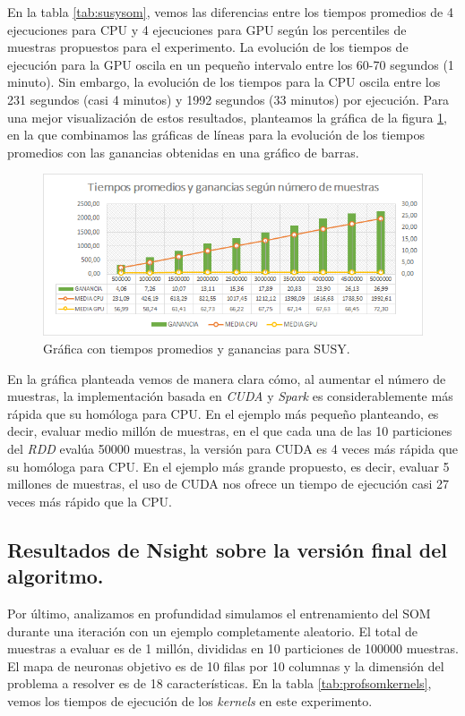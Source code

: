 En la tabla \ref{tab:susysom}, vemos las diferencias entre los tiempos promedios de 4 ejecuciones para CPU y 4 ejecuciones para GPU según los percentiles de muestras propuestos para el experimento. La evolución de los tiempos de ejecución para la GPU oscila en un pequeño intervalo entre los 60-70 segundos (1 minuto). Sin embargo, la evolución de los tiempos para la CPU oscila entre los 231 segundos (casi 4 minutos) y 1992 segundos (33 minutos) por ejecución.  Para una mejor visualización de estos resultados, planteamos la gráfica de la figura \ref{img:somsusy}, en la que combinamos las gráficas de líneas para la evolución de los tiempos promedios con las ganancias obtenidas en una gráfico de barras. \\

\begin{figure}[ht]
\centering
\includegraphics[scale=0.7]{imagenes/susysom.png}
\caption{Gráfica con tiempos promedios y ganancias para SUSY.}
\label{img:somsusy}
\end{figure}

En la gráfica planteada vemos de manera clara cómo, al aumentar el número de muestras, la implementación basada en \textit{CUDA} y \textit{Spark} es considerablemente más rápida que su homóloga para CPU. En el ejemplo más pequeño planteando, es decir, evaluar medio millón de muestras, en el que cada una de las 10 particiones del \textit{RDD} evalúa 50000 muestras, la versión para CUDA es 4 veces más rápida que su homóloga para CPU. En el ejemplo más grande propuesto, es decir, evaluar 5 millones de muestras, el uso de CUDA nos ofrece un tiempo de ejecución casi 27 veces más rápido que la CPU.


\subsection{Resultados de Nsight sobre la versión final del algoritmo.}
Por último, analizamos en profundidad simulamos el entrenamiento del SOM durante una iteración con un ejemplo completamente aleatorio. El total de muestras a evaluar es de 1 millón, divididas en 10 particiones de 100000 muestras. El mapa de neuronas objetivo es de 10 filas por 10 columnas y la dimensión del problema a resolver es de 18 características. En la tabla \ref{tab:profsomkernels}, vemos los tiempos de ejecución de los \textit{kernels} en este experimento.\\

